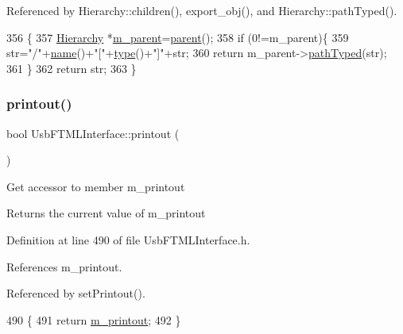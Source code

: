 Referenced by Hierarchy\+::children(), export\+\_\+obj(), and Hierarchy\+::path\+Typed().


\begin{DoxyCode}
356                                            \{
357   \hyperlink{classHierarchy}{Hierarchy} *\hyperlink{classHierarchy_a5814bb280d4e8539ab25ab6cbfb9cc4f}{m\_parent}=\hyperlink{classHierarchy_a1c7bec8257e717f9c1465e06ebf845fc}{parent}();
358   \textcolor{keywordflow}{if} (0!=m\_parent)\{
359     str=\textcolor{stringliteral}{"/"}+\hyperlink{classObject_a300f4c05dd468c7bb8b3c968868443c1}{name}()+\textcolor{stringliteral}{"["}+\hyperlink{classObject_a84f99f70f144a83e1582d1d0f84e4e62}{type}()+\textcolor{stringliteral}{"]"}+str;
360     \textcolor{keywordflow}{return} m\_parent->\hyperlink{classHierarchy_a1efd56cd164d328d2002e53a10a19b8c}{pathTyped}(str);
361   \}
362   \textcolor{keywordflow}{return} str;
363 \}
\end{DoxyCode}
\mbox{\label{classUsbFTMLInterface_a1045e3851406cf07e31c498d0de230e1}} 
\subsubsection{\texorpdfstring{printout()}{printout()}}
{\footnotesize\ttfamily bool Usb\+F\+T\+M\+L\+Interface\+::printout (\begin{DoxyParamCaption}{ }\end{DoxyParamCaption})\hspace{0.3cm}{\ttfamily [inline]}}

Get accessor to member m\+\_\+printout \begin{DoxyReturn}{Returns}
the current value of m\+\_\+printout 
\end{DoxyReturn}


Definition at line 490 of file Usb\+F\+T\+M\+L\+Interface.\+h.



References m\+\_\+printout.



Referenced by set\+Printout().


\begin{DoxyCode}
490                    \{
491     \textcolor{keywordflow}{return} \hyperlink{classUsbFTMLInterface_a57b909e50c9eba8ffbcb66e0d9649632}{m\_printout};
492   \}
\end{DoxyCode}
\mbox{\label{classUsbFTMLInterface_ad5c6964b2618149f33c258f896e9f113}} 
